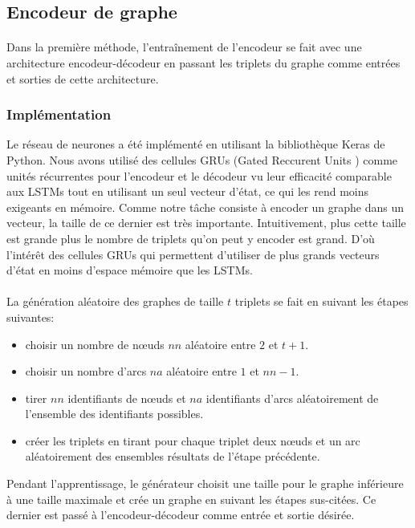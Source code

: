 \subsection{Encodeur de graphe}
\paragraph{}Dans la première méthode, l'entraînement de l'encodeur se fait avec une architecture encodeur-décodeur en passant les triplets du graphe comme entrées et sorties de cette architecture.
\subsubsection{Implémentation}
\par Le réseau de neurones a été implémenté en utilisant la bibliothèque Keras de Python. Nous avons utilisé des cellules GRUs (Gated Reccurent Units \cite{Cho2014}) comme unités récurrentes pour l'encodeur et le décodeur vu leur efficacité comparable aux LSTMs tout en utilisant un seul vecteur d'état, ce qui les rend moins exigeants en mémoire. Comme notre tâche consiste à encoder un graphe dans un vecteur, la taille de ce dernier est très importante. Intuitivement, plus cette taille est grande plus le nombre de triplets qu'on peut y encoder est grand. D'où l'intérêt des cellules GRUs qui permettent d'utiliser de plus grands vecteurs d'état en moins d'espace mémoire que les LSTMs.
\paragraph{}La génération aléatoire des graphes de taille $t$ triplets se fait en suivant les étapes suivantes:
\begin{itemize}
	\item choisir un nombre de n\oe{}uds $nn$ aléatoire entre $2$ et $t+1$.
	\item choisir un nombre d'arcs $na$ aléatoire entre $1$ et $nn-1$.
	\item tirer $nn$ identifiants de n\oe{}uds et $na$ identifiants d'arcs aléatoirement de l'ensemble des identifiants possibles.
	\item créer les triplets en tirant pour chaque triplet deux n\oe{}uds et un arc aléatoirement des ensembles résultats de l'étape précédente. 
\end{itemize}
\par Pendant l'apprentissage, le générateur choisit une taille pour le graphe inférieure à une taille maximale et crée un graphe en suivant les étapes sus-citées. Ce dernier est passé à l'encodeur-décodeur comme entrée et sortie désirée.

